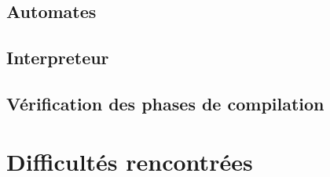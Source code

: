\documentclass{article}
\begin{document}
\subsection{Automates}

\subsection{Interpreteur}
\label{interpreter}

\subsection{Vérification des phases de compilation}
\label{compilVerif}

\cite{Colaco05}

\section{Difficultés rencontrées}

{}

\end{document}
